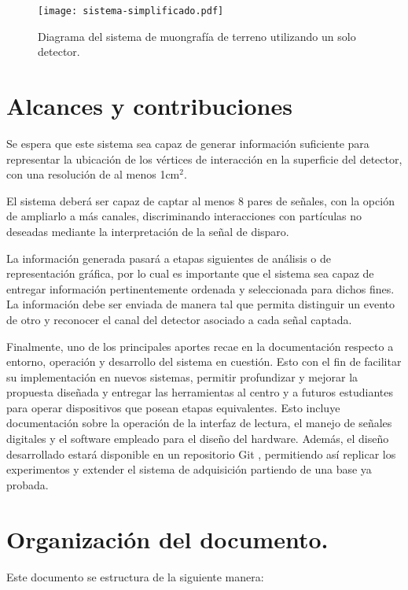	\begin{figure}[t]
		\centering
		\texttt{[image: sistema-simplificado.pdf]}
		\caption{Diagrama del sistema de muongrafía de terreno utilizando un solo detector.}
		\label{img:sistema}
	\end{figure}						

\section{Alcances y contribuciones}

	Se espera que este sistema sea capaz de generar información suficiente para representar la ubicación de los vértices de interacción en la superficie del detector, con una resolución de al menos 1cm$^2$.
	
	El sistema deberá ser capaz de captar al menos 8 pares de señales, con la opción de ampliarlo a más canales, discriminando interacciones con partículas no deseadas mediante la interpretación de la señal de disparo.
	
	La información generada pasará a etapas siguientes de análisis o de representación gráfica, por lo cual es importante que el sistema sea capaz de entregar información pertinentemente ordenada y seleccionada para dichos fines. La información debe ser enviada de manera tal que permita distinguir un evento de otro y reconocer el canal del detector asociado a cada señal captada.
	
	Finalmente, uno de los principales aportes recae en la documentación respecto a entorno, operación y desarrollo del sistema en cuestión. Esto con el fin de facilitar su implementación en nuevos sistemas, permitir profundizar y mejorar la propuesta diseñada y entregar las herramientas al centro y a futuros estudiantes para operar dispositivos que posean etapas equivalentes. Esto incluye documentación sobre la operación de la interfaz de lectura, el manejo de señales digitales y el software empleado para el diseño del hardware. Además, el diseño desarrollado estará disponible en un repositorio Git \cite{GonzalezMuonRepository}, permitiendo así replicar los experimentos y extender el sistema de adquisición partiendo de una base ya probada.

\section{Organización del documento.}

	Este documento se estructura de la siguiente manera:
	
